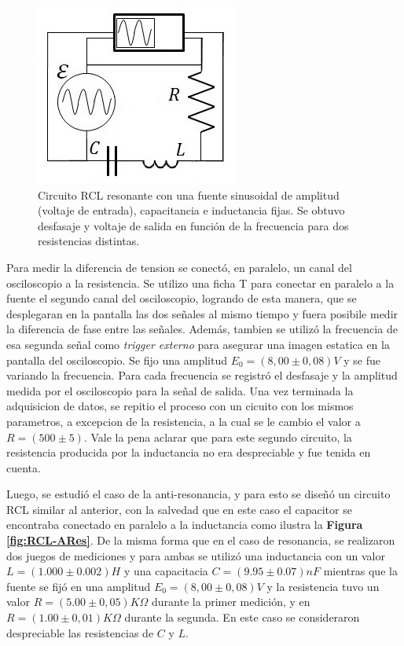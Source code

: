 \documentclass[11pt,a4paper]{article}
\begin{document}
\begin{figure}[h]
\centering
\includegraphics[scale=0.7]{Circuito-RCL-Resonante}
  \caption{Circuito RCL resonante con una fuente sinusoidal de amplitud (voltaje de entrada), capacitancia e inductancia fijas. Se obtuvo desfasaje y voltaje de salida en función de la frecuencia para dos resistencias distintas.}
  \label{fig:RCL-Res}
\end{figure}

Para medir la diferencia de tension se conectó, en paralelo, un canal del osciloscopio a la resistencia. Se utilizo una ficha T para conectar en paralelo a la fuente el segundo canal del osciloscopio, logrando de esta manera, que se desplegaran en la pantalla las dos señales al mismo tiempo y fuera posibile medir la diferencia de fase entre las señales. Además, tambien se utilizó la frecuencia de esa segunda señal como \textit{trigger externo} para asegurar una imagen estatica en la pantalla del osciloscopio. Se fijo una amplitud $E_{0} = (8,00 \pm 0,08)V$ y se fue variando la frecuencia. Para cada frecuencia se registró el desfasaje y la amplitud medida por el osciloscopio para la señal de salida. Una vez terminada la adquisicion de datos, se repitio el proceso con un cicuito con los mismos parametros, a excepcion de la resistencia, a la cual se le cambio el valor a $R = (500 \pm 5)$. Vale la pena aclarar que para este segundo circuito, la resistencia producida por la inductancia no era despreciable y fue tenida en cuenta.

Luego, se estudió el caso de la anti-resonancia, y para esto se diseñó un circuito RCL similar al anterior, con la salvedad que en este caso el capacitor se encontraba conectado en paralelo a la inductancia como ilustra la \textbf{Figura \ref{fig:RCL-ARes}}. De la misma forma que en el caso de resonancia, se realizaron dos juegos de mediciones y para ambas se utilizó una inductancia con un valor $L = (1.000 \pm0.002)H$ y una capacitacia $C = (9.95 \pm 0.07)nF$ mientras que la fuente se fijó en una amplitud $E_{0} = (8,00 \pm 0,08)V$ y la resistencia tuvo un valor $R = (5.00 \pm 0,05)K\Omega$ durante la primer medición, y en $R = (1.00 \pm 0,01)K\Omega$ durante la segunda. En este caso se consideraron despreciable las resistencias de $C$ y $L$.
\end{document}
